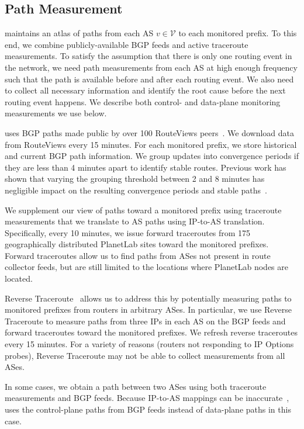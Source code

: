 \subsection{Path Measurement}
\label{subsec:measurement}

\ouralgo maintains an atlas of paths from each AS $v \in \mathcal{V}$
to each monitored prefix.  To this end, we combine publicly-available
BGP feeds and active traceroute measurements.  To satisfy the
assumption that there is only one routing event in the network, we need
path measurements from each AS at high enough frequency such that the
path is available before and after each routing event.  We also need to
collect all necessary information and identify the root cause before the
next routing event happens.  We describe both control- and
data-plane monitoring measurements we use below.

 \ouralgo uses BGP paths made public
by over 100 RouteViews peers~\cite{routeviews}.  We download data from
RouteViews every 15 minutes.  For each monitored prefix, we store
historical and current BGP path information.  We group updates into
convergence periods if they are less than 4 minutes apart to identify
stable routes.  Previous work has shown that varying the grouping
threshold between 2 and 8 minutes has negligible impact on the resulting
convergence periods and stable paths~\cite{needle, lifeguard}.

   We supplement our view of paths
toward a monitored prefix using traceroute measurements that we
translate to AS paths using IP-to-AS translation.  Specifically, every 10 minutes, 
we issue 
forward traceroutes from 175 geographically distributed PlanetLab
sites toward the monitored prefixes.  Forward
traceroutes allow us to find paths from ASes not present in route collector feeds,
but are still limited to the locations where PlanetLab nodes are located.

Reverse Traceroute~\cite{revtr} allows us to address this by potentially 
measuring paths to monitored prefixes from routers in arbitrary ASes.  In
particular, we use Reverse Traceroute to measure paths from three IPs in
each AS on the BGP feeds and forward traceroutes toward the
monitored prefixes.  We refresh reverse traceroutes every 15
minutes.  For a variety of reasons (\eg routers not responding to IP Options probes), 
Reverse Traceroute may not be able to collect
measurements from all ASes.  

  In some cases, we obtain
a path between two ASes
using both traceroute measurements and BGP feeds. 
Because IP-to-AS
mappings can be inaccurate~\cite{as-level-traceroute, ono-sidewalk-ends}, \ouralgo uses the 
control-plane paths from BGP feeds instead of data-plane paths in this case.

